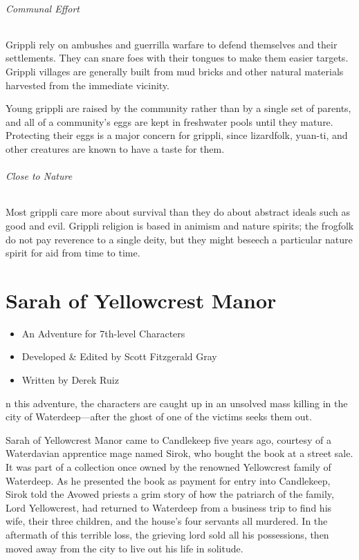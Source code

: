 \documentclass[10pt,a4paper,twoside,bg=print,twocolumn,openany,nodeprecatedcode]{dndbook}
\begin{document}
\subparagraph{Communal Effort}
Grippli rely on ambushes and guerrilla warfare to defend themselves and their settlements. They can snare foes with their tongues to make them easier targets. Grippli villages are generally built from mud bricks and other natural materials harvested from the immediate vicinity.

Young grippli are raised by the community rather than by a single set of parents, and all of a community's eggs are kept in freshwater pools until they mature. Protecting their eggs is a major concern for grippli, since lizardfolk, yuan-ti, and other creatures are known to have a taste for them.

\subparagraph{Close to Nature}
Most grippli care more about survival than they do about abstract ideals such as good and evil. Grippli religion is based in animism and nature spirits; the frogfolk do not pay reverence to a single deity, but they might beseech a particular nature spirit for aid from time to time.

\chapter{Sarah of Yellowcrest Manor}

\begin{itemize}
\item An Adventure for 7th-level Characters
\item Developed \& Edited by Scott Fitzgerald Gray
\item Written by Derek Ruiz
\end{itemize}

n this adventure, the characters are caught up in an unsolved mass killing in the city of Waterdeep—after the ghost of one of the victims seeks them out.


Sarah of Yellowcrest Manor came to Candlekeep five years ago, courtesy of a Waterdavian apprentice mage named Sirok, who bought the book at a street sale. It was part of a collection once owned by the renowned Yellowcrest family of Waterdeep. As he presented the book as payment for entry into Candlekeep, Sirok told the Avowed priests a grim story of how the patriarch of the family, Lord Yellowcrest, had returned to Waterdeep from a business trip to find his wife, their three children, and the house's four servants all murdered. In the aftermath of this terrible loss, the grieving lord sold all his possessions, then moved away from the city to live out his life in solitude.
\end{document}
